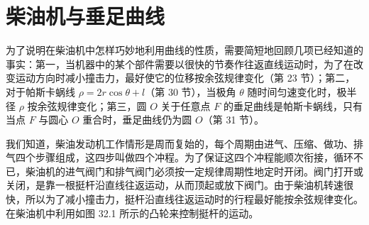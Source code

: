 \section{柴油机与垂足曲线}

为了说明在柴油机中怎样巧妙地利用曲线的性质，需要简短地回顾几项已经知道的事实：第一，当机器中的某个部件需要以很快的节奏作往返直线运动时，为了在改变运动方向时减小撞击力，最好使它的位移按余弦规律变化（第 23 节）；第二，对于帕斯卡蜗线 $\rho=2r\cos\theta+l$（第 30 节），当极角 $\theta$ 随时间匀速变化时，极半径 $\rho$ 按余弦规律变化；第三，圆 $O$ 关于任意点 $F$ 的垂足曲线是帕斯卡蜗线，只有当点 $F$ 与圆心 $O$ 重合时，垂足曲线仍为圆 $O$（第 31 节）。

我们知道，柴油发动机工作情形是周而复始的，每个周期由进气、压缩、做功、排气四个步骤组成，这四步叫做四个冲程。为了保证这四个冲程能顺次衔接，循环不已，柴油机的进气阀门和排气阀门必须按一定规律周期性地定时开闭。阀门打开或关闭，是靠一根挺杆沿直线往返运动，从而顶起或放下阀门。由于柴油机转速很快，所以为了减小撞击力，挺杆沿直线往返运动时的行程最好能按余弦规律变化。在柴油机中利用如图 32.1 所示的凸轮来控制挺杆的运动。


